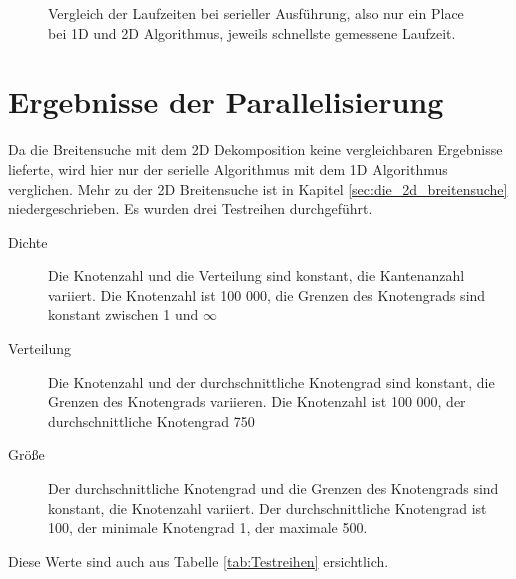 \begin{figure}
	\centering
	\label{fig:Vergleich_Seriell}
	\caption{Vergleich der Laufzeiten bei serieller Ausführung, also nur ein Place bei 1D und 2D Algorithmus, jeweils schnellste gemessene Laufzeit.}
\end{figure}

\section{Ergebnisse der Parallelisierung} %
\label{sec:ergebnisse_der_parallelisierung}
Da die Breitensuche mit dem 2D Dekomposition keine vergleichbaren Ergebnisse lieferte, wird hier nur der serielle Algorithmus mit dem 1D Algorithmus verglichen. Mehr zu der 2D Breitensuche ist in Kapitel \ref{sec:die_2d_breitensuche} niedergeschrieben. Es wurden drei Testreihen durchgeführt.
\begin{description}
	\item[Dichte] Die Knotenzahl und die Verteilung sind konstant, die Kantenanzahl variiert. Die Knotenzahl ist 100 000, die Grenzen des Knotengrads sind konstant zwischen 1 und $\infty$
	\item[Verteilung] Die Knotenzahl und der durchschnittliche Knotengrad sind konstant, die Grenzen des Knotengrads variieren. Die Knotenzahl ist 100 000, der durchschnittliche Knotengrad 750
	\item[Größe] Der durchschnittliche Knotengrad und die Grenzen des Knotengrads sind konstant, die Knotenzahl variiert. Der durchschnittliche Knotengrad ist 100, der minimale Knotengrad 1, der maximale 500.
\end{description}
Diese Werte sind auch aus Tabelle \ref{tab:Testreihen} ersichtlich.

